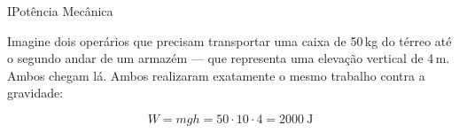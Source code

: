 



   














\begin{secnivel}{I}{Potência Mecânica}
 

  
\end{secnivel}










Imagine dois operários que precisam transportar uma caixa de 50\,kg do térreo até o segundo andar de um armazém — que representa uma elevação vertical de 4\,m. Ambos chegam lá. Ambos realizaram exatamente o mesmo trabalho contra a gravidade:

\[
W = mgh = 50 \cdot 10 \cdot 4 = 2000\ \text{J}
\]

